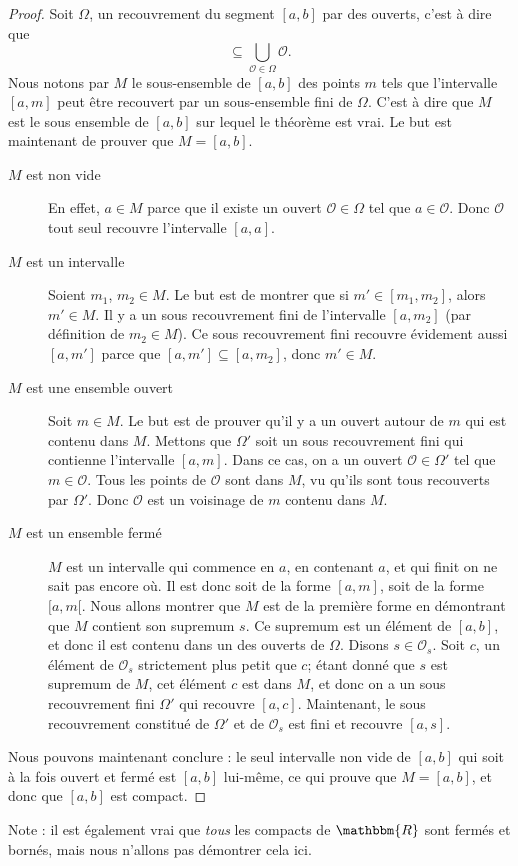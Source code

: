 \documentclass[a4paper,12pt]{book}
\newcommand{\eR}{\mathbbm{R}}
\theoremstyle{mes_exemples}	\newtheorem{exemple}[numtho]{Exemple}
\theoremstyle{mes_tho}
\newcommand{\mO}{\mathcal{O}}
\begin{document}
\begin{proof}
	Soit $\Omega$, un recouvrement du segment $[a,b]$ par des ouverts, c'est à dire que
	\begin{equation}
		[a,b]\subseteq\bigcup_{\mO\in\Omega}\mO.
	\end{equation}
	Nous notons par $M$ le sous-ensemble de $[a,b]$ des points $m$ tels que l'intervalle $[a,m]$ peut être recouvert par un sous-ensemble fini de $\Omega$. C'est à dire que $M$ est le sous ensemble de $[a,b]$ sur lequel le théorème est vrai. Le but est maintenant de prouver que $M=[a,b]$.
	\begin{description}
		\item[$M$ est non vide] En effet, $a\in M$ parce que il existe un ouvert $\mO\in\Omega$ tel que $a\in\mO$. Donc $\mO$ tout seul recouvre l'intervalle $[a,a]$. 
		\item[$M$ est un intervalle] Soient $m_1$, $m_2\in M$. Le but est de montrer que si $m'\in[m_1,m_2]$, alors $m'\in M$. Il y a un sous recouvrement fini de l'intervalle $[a,m_2]$ (par définition de $m_2\in M$). Ce sous recouvrement fini recouvre évidement aussi $[a,m']$ parce que $[a,m']\subseteq [a,m_2]$, donc $m'\in M$.
		\item[$M$ est une ensemble ouvert] Soit $m\in M$. Le but est de prouver qu'il y a un ouvert autour de $m$ qui est contenu dans $M$. Mettons que $\Omega'$ soit un sous recouvrement fini qui contienne l'intervalle $[a,m]$. Dans ce cas, on a un ouvert $\mO\in\Omega'$ tel que $m\in\mO$. Tous les points de $\mO$ sont dans $M$, vu qu'ils sont tous recouverts par $\Omega'$. Donc $\mO$ est un voisinage de $m$ contenu dans $M$.
		\item[$M$ est un ensemble fermé] $M$ est un intervalle qui commence en $a$, en contenant $a$, et qui finit on ne sait pas encore où. Il est donc soit de la forme $[a,m]$, soit de la forme $[a,m[$. Nous allons montrer que $M$ est de la première forme en démontrant que $M$ contient son supremum $s$. Ce supremum est un élément de $[a,b]$, et donc il est contenu dans un des ouverts de $\Omega$. Disons $s\in\mO_s$. Soit $c$, un élément de $\mO_s$ strictement plus petit que $c$; étant donné que $s$ est supremum de $M$, cet élément $c$ est dans $M$, et donc on a un sous recouvrement fini $\Omega'$ qui recouvre $[a,c]$. Maintenant, le sous recouvrement constitué de $\Omega'$ et de $\mO_s$ est fini et recouvre $[a,s]$.
	\end{description}
	Nous pouvons maintenant conclure : le seul intervalle non vide de $[a,b]$ qui soit à la fois ouvert et fermé est $[a,b]$ lui-même, ce qui prouve que $M=[a,b]$, et donc que $[a,b]$ est compact.
\end{proof}
Note : il est également vrai que \emph{tous} les compacts de $\eR$ sont fermés et bornés, mais nous n'allons pas démontrer cela ici.
\end{document}
